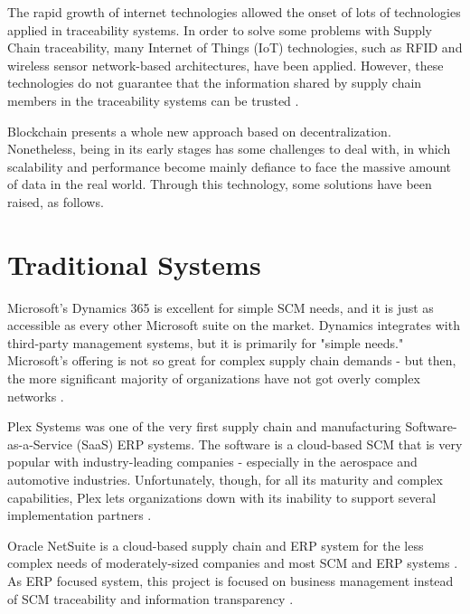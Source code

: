 \label{chap:RelatedWork}

\acresetall 

The rapid growth of internet technologies allowed the onset of lots of technologies applied in traceability systems. In order to solve some problems with Supply Chain traceability, many Internet of Things (IoT) technologies, such as RFID and wireless sensor network-based architectures, have been applied. However, these technologies do not guarantee that the information shared by supply chain members in the traceability systems can be trusted \cite{tian2017supply}.

Blockchain presents a whole new approach based on decentralization. Nonetheless, being in its early stages has some challenges to deal with, in which scalability and performance become mainly defiance to face the massive amount of data in the real world. Through this technology, some solutions have been raised, as follows.

\section{Traditional Systems} \label{sec:TraditionalSystems}

Microsoft's Dynamics 365 is excellent for simple SCM needs, and it is just as accessible as every other Microsoft suite on the market. Dynamics integrates with third-party management systems, but it is primarily for "simple needs." Microsoft's offering is not so great for complex supply chain demands - but then, the  more significant majority of organizations have not got overly complex networks \cite{bellu2018microsoft}.

Plex Systems was one of the very first supply chain and manufacturing Software-as-a-Service (SaaS) ERP systems. The software is a cloud-based SCM that is very popular with industry-leading companies - especially in the aerospace and automotive industries. Unfortunately, though, for all its maturity and complex capabilities, Plex lets organizations down with its inability to support several implementation partners \cite{plex}.

Oracle NetSuite is a cloud-based supply chain and ERP system for the less complex needs of moderately-sized companies and most SCM and ERP systems \cite{rolling2016using}. As ERP focused system, this project is focused on business management instead of SCM traceability and information transparency \cite{rolling2016using}.

